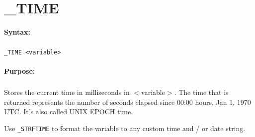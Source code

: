 
\newpage
\section{\_TIME}
\label{cmd:_TIME}

\paragraph{Syntax:}
\subparagraph{}
\texttt{\_TIME <variable>}

\paragraph{Purpose:}
\subparagraph{}
Stores the current time in milliseconds in $<$variable$>$. The time that is returned represents the number of seconds elapsed since 00:00 hours, Jan 1, 1970 UTC. It’s also called UNIX EPOCH time.

Use \texttt{\_STRFTIME} to format the variable to any custom time and / or date string.